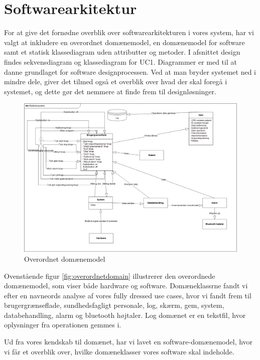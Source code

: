 \section{Softwarearkitektur}
For at give det fornødne overblik over softwarearkitekturen i vores system, har vi valgt at inkludere en overordnet domænemodel, en domænemodel for software samt et statisk klassediagram uden attributter og metoder. I afsnittet design findes sekvensdiagram og klassediagram for UC1. Diagrammer er med til at danne grundlaget for software designprocessen. Ved at man bryder systemet ned i mindre dele, giver det tilmed også et overblik over hvad der skal foregå i systemet, og dette gør det nemmere at finde frem til designløsninger. 

	\begin{figure}[h!]
	\centering
	\includegraphics[width=1\linewidth]{Arkitektur_og_design/Softwarearkitektur/overordnetdomain}	
	\caption{Overordnet domænemodel}
	\label{fig:overordnetdomain}
\end{figure}

Ovenstående figur \vref{fig:overordnetdomain} illustrerer den overordnede domænemodel, som viser både hardware og software. Domæneklassrne fandt vi efter en navneords analyse af vores fully dressed use cases, hvor vi fandt frem til brugergrænseflade, sundhedsfagligt personale, log, skærm, gem, system, databehandling, alarm og bluetooth højtaler.  Log domænet er en tekstfil, hvor oplysninger fra operationen gemmes i.


  
Ud fra vores kendskab til domænet, har vi lavet en software-domænemodel, hvor vi får et overblik over, hvilke domæneklasser vores software skal indeholde. 

